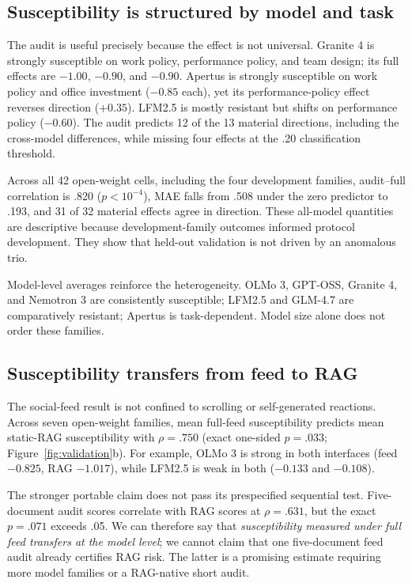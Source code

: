 \documentclass[11pt,letterpaper]{article}
\newcommand{\model}[1]{\textsf{#1}}
\begin{document}
\subsection{Susceptibility is structured by model and task}
\label{sec:heterogeneity}

The audit is useful precisely because the effect is not universal.
\model{Granite 4} is strongly susceptible on work policy, performance policy,
and team design; its full effects are $-1.00$, $-0.90$, and $-0.90$.
\model{Apertus} is strongly susceptible on work policy and office investment
($-0.85$ each), yet its performance-policy effect reverses direction
($+0.35$). \model{LFM2.5} is mostly resistant but shifts on performance policy
($-0.60$). The audit predicts 12 of the 13 material directions, including the
cross-model differences, while missing four effects at the .20 classification
threshold.

Across all 42 open-weight cells, including the four development families,
audit--full correlation is .820 ($p<10^{-4}$), MAE falls from .508 under the
zero predictor to .193, and 31 of 32 material effects agree in direction.
These all-model quantities are descriptive because development-family
outcomes informed protocol development. They show that held-out validation is
not driven by an anomalous trio.

Model-level averages reinforce the heterogeneity. \model{OLMo 3},
\model{GPT-OSS}, \model{Granite 4}, and \model{Nemotron 3} are consistently
susceptible; \model{LFM2.5} and \model{GLM-4.7} are comparatively resistant;
\model{Apertus} is task-dependent. Model size alone does not order these
families.

\subsection{Susceptibility transfers from feed to RAG}
\label{sec:rag-result}

The social-feed result is not confined to scrolling or self-generated
reactions. Across seven open-weight families, mean full-feed susceptibility
predicts mean static-RAG susceptibility with $\rho=.750$ (exact one-sided
$p=.033$; Figure~\ref{fig:validation}b). For example, \model{OLMo 3} is strong
in both interfaces (feed $-0.825$, RAG $-1.017$), while \model{LFM2.5} is weak
in both ($-0.133$ and $-0.108$).

The stronger portable claim does not pass its prespecified sequential test. Five-document
audit scores correlate with RAG scores at $\rho=.631$, but the exact
$p=.071$ exceeds .05. We can therefore say that \emph{susceptibility measured
under full feed transfers at the model level}; we cannot claim that one
five-document feed audit already certifies RAG risk. The latter is a promising
estimate requiring more model families or a RAG-native short audit.
\end{document}
